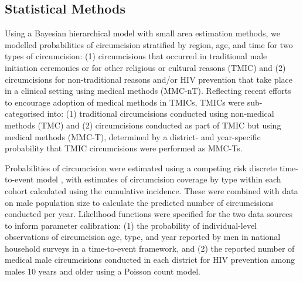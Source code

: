 \documentclass{article}
\renewcommand{\thefigure}{S\arabic{figure}}
\renewcommand{\thetable}{S\arabic{table}}
\begin{document}

\begin{appendix}


\newpage

\tableofcontents

\newpage


\section{Statistical Methods}
\label{sec::methods}


\noindent Using a Bayesian hierarchical model with small area estimation methods, we modelled probabilities of circumcision stratified by region, age, and time for two types of circumcision: (1) circumcisions that occurred in traditional male initiation ceremonies or for other religious or cultural reasons (TMIC) and (2) circumcisions for non-traditional reasons and/or HIV prevention that take place in a clinical setting using medical methods (MMC-nT). Reflecting recent efforts to encourage adoption of medical methods in TMICs, TMICs were sub-categorised into: (1) traditional circumcisions conducted using non-medical methods (TMC) and (2) circumcisions conducted as part of TMIC but using medical methods (MMC-T), determined by a district- and year-specific probability that TMIC circumcisions were performed as MMC-Ts.

\noindent Probabilities of circumcision were estimated using a competing risk discrete time-to-event model \cite{putter2006tutorial}, with estimates of circumcision coverage by type within each cohort calculated using the cumulative incidence. These were combined with data on male population size to calculate the predicted number of circumcisions conducted per year. Likelihood functions were specified for the two data sources to inform parameter calibration: (1) the probability of individual-level observations of circumcision age, type, and year reported by men in national household surveys in a time-to-event framework, and (2) the reported number of medical male circumcisions conducted in each district for HIV prevention among males 10 years and older using a Poisson count model. 


\end{appendix}
\end{document}
